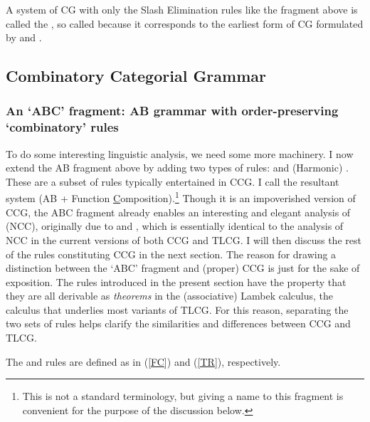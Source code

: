 \documentclass[output=paper]{langsci/langscibook}
\begin{document}
\noindent
A system of CG with only the Slash Elimination rules like the fragment
above is called the , so called because it corresponds to
the earliest form of CG formulated by
\citet{Ajdukiewicz35a-u} and \citet{bar-hillel53}.


\subsection{Combinatory Categorial Grammar \label{sec:CCG}}

\subsubsection{An `ABC' fragment: AB grammar with order-preserving `combinatory' rules \label{preCCG}}

To do some interesting linguistic analysis, we need some more
machinery. I now extend the AB fragment above by adding two types of
rules:  and (Harmonic) . These are
a subset of rules typically entertained in CCG. I call the resultant
system  (AB + Function
\underline{C}omposition).\footnote{This is not a standard terminology,
  but giving a name to this fragment is convenient for the purpose of the
discussion below.} Though it is an impoverished version of CCG, the
ABC fragment 
already enables an interesting and elegant analysis of
 (NCC), originally due to \citet{Steedman85a-u} and
\citet{Dowty88a-u}, which is essentially identical to the analysis of NCC in
the current versions of both CCG and TLCG. I will then discuss the
rest of the rules constituting CCG in the next section. The reason for
drawing a distinction between the `ABC' fragment and (proper) CCG is
just for the sake of exposition. The rules introduced in the present
section have the property that they are all derivable as \emph{theorems} in
the (associative) Lambek calculus, the calculus that underlies most
variants of TLCG. For this reason, separating the two sets of rules
helps clarify the similarities and differences between CCG and TLCG.

The  and  rules are defined as in
(\ref{FC}) and (\ref{TR}), respectively. 
\end{document}
